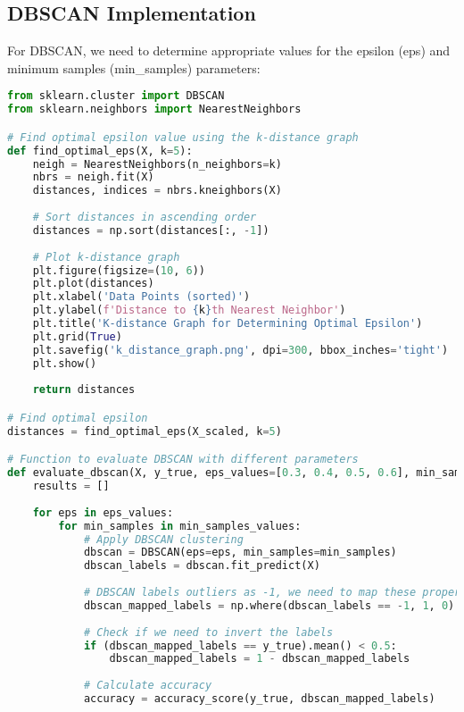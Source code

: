 \subsection{DBSCAN Implementation}
For DBSCAN, we need to determine appropriate values for the epsilon (eps) and minimum samples (min\_samples) parameters:

\begin{lstlisting}[language=Python, caption=DBSCAN Implementation and Parameter Tuning]
from sklearn.cluster import DBSCAN
from sklearn.neighbors import NearestNeighbors

# Find optimal epsilon value using the k-distance graph
def find_optimal_eps(X, k=5):
    neigh = NearestNeighbors(n_neighbors=k)
    nbrs = neigh.fit(X)
    distances, indices = nbrs.kneighbors(X)
    
    # Sort distances in ascending order
    distances = np.sort(distances[:, -1])
    
    # Plot k-distance graph
    plt.figure(figsize=(10, 6))
    plt.plot(distances)
    plt.xlabel('Data Points (sorted)')
    plt.ylabel(f'Distance to {k}th Nearest Neighbor')
    plt.title('K-distance Graph for Determining Optimal Epsilon')
    plt.grid(True)
    plt.savefig('k_distance_graph.png', dpi=300, bbox_inches='tight')
    plt.show()
    
    return distances

# Find optimal epsilon
distances = find_optimal_eps(X_scaled, k=5)

# Function to evaluate DBSCAN with different parameters
def evaluate_dbscan(X, y_true, eps_values=[0.3, 0.4, 0.5, 0.6], min_samples_values=[3, 5, 7, 10]):
    results = []
    
    for eps in eps_values:
        for min_samples in min_samples_values:
            # Apply DBSCAN clustering
            dbscan = DBSCAN(eps=eps, min_samples=min_samples)
            dbscan_labels = dbscan.fit_predict(X)
            
            # DBSCAN labels outliers as -1, we need to map these properly
            dbscan_mapped_labels = np.where(dbscan_labels == -1, 1, 0)
            
            # Check if we need to invert the labels
            if (dbscan_mapped_labels == y_true).mean() < 0.5:
                dbscan_mapped_labels = 1 - dbscan_mapped_labels
                
            # Calculate accuracy
            accuracy = accuracy_score(y_true, dbscan_mapped_labels)
            

\end{lstlisting}
